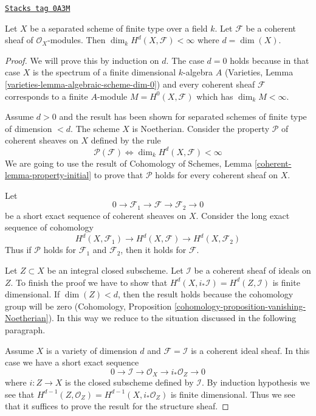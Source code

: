 \begin{lemma}
\label{etale-cohomology-lemma-top-cohomology-coherent}
\href{https://stacks.math.columbia.edu/tag/0A3M}{\texttt{Stacks tag 0A3M}}

Let $X$ be a separated scheme of finite type over a field $k$.
Let $\mathcal{F}$ be a coherent sheaf of $\mathcal{O}_X$-modules.
Then $\dim_k H^d(X, \mathcal{F}) < \infty$ where $d = \dim(X)$.
\end{lemma}

\begin{proof}
We will prove this by induction on $d$. The case $d = 0$ holds because
in that case $X$ is the spectrum of a finite dimensional $k$-algebra $A$
(Varieties, Lemma \ref{varieties-lemma-algebraic-scheme-dim-0})
and every coherent sheaf $\mathcal{F}$ corresponds to a finite $A$-module
$M = H^0(X, \mathcal{F})$ which has $\dim_k M < \infty$.

\medskip\noindent
Assume $d > 0$ and the result has been shown for separated schemes
of finite type of dimension $< d$. The scheme $X$ is Noetherian. Consider
the property $\mathcal{P}$ of coherent sheaves on $X$ defined by the rule
$$
\mathcal{P}(\mathcal{F}) \Leftrightarrow
\dim_k H^d(X, \mathcal{F}) < \infty
$$
We are going to use the result of
Cohomology of Schemes, Lemma \ref{coherent-lemma-property-initial}
to prove that $\mathcal{P}$ holds for every coherent sheaf on $X$.

\medskip\noindent
Let
$$
0 \to \mathcal{F}_1 \to \mathcal{F} \to \mathcal{F}_2 \to 0
$$
be a short exact sequence of coherent sheaves on $X$.
Consider the long exact sequence of cohomology
$$
H^d(X, \mathcal{F}_1) \to
H^d(X, \mathcal{F}) \to
H^d(X, \mathcal{F}_2)
$$
Thus if $\mathcal{P}$ holds for $\mathcal{F}_1$ and $\mathcal{F}_2$,
then it holds for $\mathcal{F}$.

\medskip\noindent
Let $Z \subset X$ be an integral closed subscheme. Let $\mathcal{I}$
be a coherent sheaf of ideals on $Z$. To finish the proof we have to show
that $H^d(X, i_*\mathcal{I}) = H^d(Z, \mathcal{I})$ is finite dimensional.
If $\dim(Z) < d$, then the result holds because the cohomology group
will be zero (Cohomology, Proposition
\ref{cohomology-proposition-vanishing-Noetherian}).
In this way we reduce to the situation discussed in the following paragraph.

\medskip\noindent
Assume $X$ is a variety of dimension $d$ and
$\mathcal{F} = \mathcal{I}$ is a coherent ideal sheaf. In this
case we have a short exact sequence
$$
0 \to \mathcal{I} \to \mathcal{O}_X \to i_*\mathcal{O}_Z \to 0
$$
where $i : Z \to X$ is the closed subscheme defined by $\mathcal{I}$.
By induction hypothesis we see that
$H^{d - 1}(Z, \mathcal{O}_Z) = H^{d - 1}(X, i_*\mathcal{O}_Z)$ is
finite dimensional. Thus we see that it suffices to prove the result
for the structure sheaf.


\end{proof}
